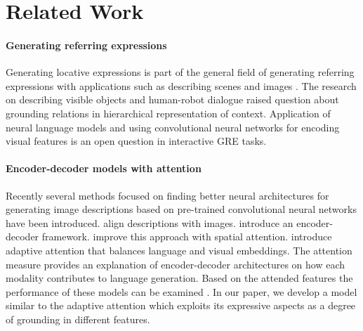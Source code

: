 \section{Related Work}
\label{inlg2019:sec:related_works}




\paragraph{Generating referring expressions}
Generating locative expressions is part of the general field of generating referring expressions \cite{DaleReiter:1995,Krahmer:2011aa} with applications such as describing scenes \cite{Viethen:2008aa} and images \cite{Mitchell:2012aa}.
The research on describing visible objects \cite{mitchell-etal-2013-generating} and human-robot dialogue \cite{kelleher-kruijff-2006-incremental} raised question about grounding relations in hierarchical representation of context.
Application of neural language models and using convolutional neural networks for encoding visual features is an open question in interactive GRE tasks.

\paragraph{Encoder-decoder models with attention} Recently several
methods focused on finding better neural architectures for generating
image descriptions based on pre-trained convolutional neural networks
have been introduced. \citet{karpathy2015deep} align descriptions with
images. \citet{vinyals2015show} introduce an encoder-decoder
framework. \citet{xu2015show} improve this approach with spatial
attention. \citet{lu2017knowing} introduce adaptive attention that
balances language and visual embeddings. The attention measure
provides an explanation of encoder-decoder architectures on how each
modality contributes to language generation. Based on the attended features
the %
performance of these models can be examined
\cite{liu2017attention,ghanimifard2018knowing}. In our paper, we
develop a model similar to the adaptive attention
which %
exploits its expressive aspects as 
a degree of 
grounding
in different features.

